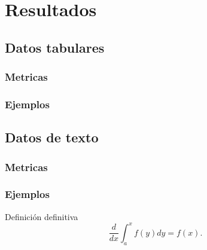 \chapter{Resultados}
\section{Datos tabulares}
\subsection{Metricas}
\subsection{Ejemplos}
\section{Datos de texto}
\subsection{Metricas}
\subsection{Ejemplos}
\lipsum[1-3]
\begin{defn} Definición definitiva $$\frac{d}{dx}\int_a^xf(y)dy=f(x).$$\end{defn}